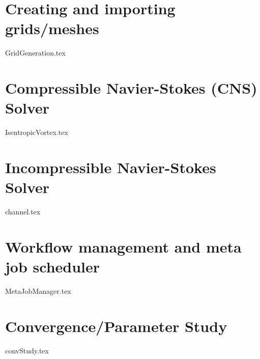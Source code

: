 \documentclass[a4paper,10pt]{report} %
\begin{document}
\chapter{Creating and importing grids/meshes }
\label{sec:GridCreation}
{GridGeneration.tex}

\chapter{Compressible Navier-Stokes (CNS) Solver }
\label{sec:CNS}
{IsentropicVortex.tex}

\chapter{Incompressible Navier-Stokes Solver}
\label{sec:IBM}
{channel.tex}

\chapter{Workflow management and meta job scheduler}
\label{sec:WorkflowMgm}
{MetaJobManager.tex}

\chapter{Convergence/Parameter Study}
\label{sec:Parameterstudy}
{convStudy.tex}

\end{document}
